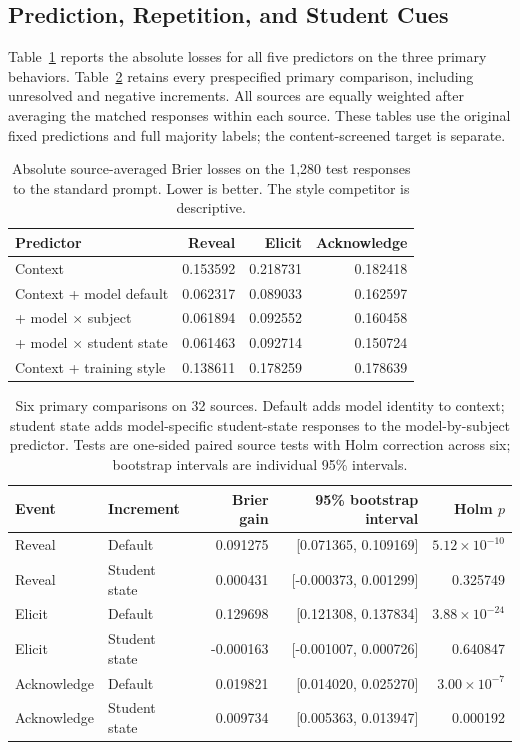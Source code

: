 \subsection{Prediction, Repetition, and Student Cues}

Table~\ref{tab:absolute-losses} reports the absolute losses for all five
predictors on the three primary behaviors. Table~\ref{tab:primary-tests}
retains every prespecified primary comparison, including unresolved and negative
increments. All sources are equally weighted after averaging the matched
responses within each source. These tables use the original fixed predictions
and full majority labels; the content-screened target is separate.

\begin{table}[htbp]\centering\small
\begin{tabular}{lrrr}\toprule
Predictor & Reveal & Elicit & Acknowledge \\
\midrule
Context & 0.153592 & 0.218731 & 0.182418 \\
Context + model default & 0.062317 & 0.089033 & 0.162597 \\
+ model $\times$ subject & 0.061894 & 0.092552 & 0.160458 \\
+ model $\times$ student state & 0.061463 & 0.092714 & 0.150724 \\
Context + training style & 0.138611 & 0.178259 & 0.178639 \\
\bottomrule\end{tabular}
\caption{Absolute source-averaged Brier losses on the 1,280 test responses to the standard prompt. Lower is better. The style competitor is descriptive.}
\label{tab:absolute-losses}\end{table}

\begin{table}[htbp]\centering\small
\begin{tabular}{llrrr}\toprule
Event & Increment & Brier gain & 95\% bootstrap interval & Holm $p$ \\
\midrule
Reveal & Default & 0.091275 & [0.071365, 0.109169] & $5.12\times10^{-10}$ \\
Reveal & Student state & 0.000431 & [-0.000373, 0.001299] & 0.325749 \\
Elicit & Default & 0.129698 & [0.121308, 0.137834] & $3.88\times10^{-24}$ \\
Elicit & Student state & -0.000163 & [-0.001007, 0.000726] & 0.640847 \\
Acknowledge & Default & 0.019821 & [0.014020, 0.025270] & $3.00\times10^{-7}$ \\
Acknowledge & Student state & 0.009734 & [0.005363, 0.013947] & 0.000192 \\
\bottomrule\end{tabular}
\caption{Six primary comparisons on 32 sources. Default adds model identity
to context; student state adds model-specific student-state responses to the
model-by-subject predictor. Tests are one-sided paired source tests with
Holm correction across six; bootstrap intervals are individual 95\% intervals.}
\label{tab:primary-tests}\end{table}

